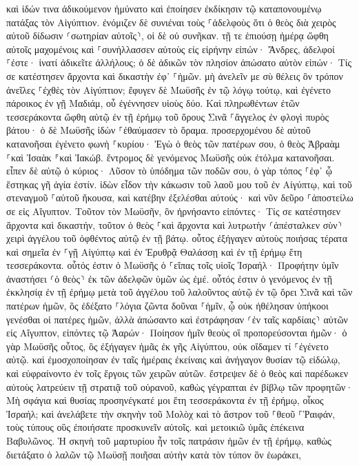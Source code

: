 \documentclass[twoside, 9pt]{extreport}
\begin{document}
καὶ ἰδών τινα ἀδικούμενον ἠμύνατο καὶ ἐποίησεν ἐκδίκησιν τῷ καταπονουμένῳ πατάξας τὸν Αἰγύπτιον. 
ἐνόμιζεν δὲ συνιέναι τοὺς ⸀ἀδελφοὺς ὅτι ὁ θεὸς διὰ χειρὸς αὐτοῦ δίδωσιν ⸂σωτηρίαν αὐτοῖς⸃, οἱ δὲ οὐ συνῆκαν. 
τῇ τε ἐπιούσῃ ἡμέρᾳ ὤφθη αὐτοῖς μαχομένοις καὶ ⸀συνήλλασσεν αὐτοὺς εἰς εἰρήνην εἰπών· Ἄνδρες, ἀδελφοί ⸀ἐστε· ἱνατί ἀδικεῖτε ἀλλήλους; 
ὁ δὲ ἀδικῶν τὸν πλησίον ἀπώσατο αὐτὸν εἰπών· Τίς σε κατέστησεν ἄρχοντα καὶ δικαστὴν ἐφ᾽ ⸀ἡμῶν. 
μὴ ἀνελεῖν με σὺ θέλεις ὃν τρόπον ἀνεῖλες ⸀ἐχθὲς τὸν Αἰγύπτιον; 
ἔφυγεν δὲ Μωϋσῆς ἐν τῷ λόγῳ τούτῳ, καὶ ἐγένετο πάροικος ἐν γῇ Μαδιάμ, οὗ ἐγέννησεν υἱοὺς δύο. 
Καὶ πληρωθέντων ἐτῶν τεσσεράκοντα ὤφθη αὐτῷ ἐν τῇ ἐρήμῳ τοῦ ὄρους Σινᾶ ⸀ἄγγελος ἐν φλογὶ πυρὸς βάτου· 
ὁ δὲ Μωϋσῆς ἰδὼν ⸀ἐθαύμασεν τὸ ὅραμα. προσερχομένου δὲ αὐτοῦ κατανοῆσαι ἐγένετο φωνὴ ⸀κυρίου· 
Ἐγὼ ὁ θεὸς τῶν πατέρων σου, ὁ θεὸς Ἀβραὰμ ⸀καὶ Ἰσαὰκ ⸁καὶ Ἰακώβ. ἔντρομος δὲ γενόμενος Μωϋσῆς οὐκ ἐτόλμα κατανοῆσαι. 
εἶπεν δὲ αὐτῷ ὁ κύριος· Λῦσον τὸ ὑπόδημα τῶν ποδῶν σου, ὁ γὰρ τόπος ⸀ἐφ᾽ ᾧ ἕστηκας γῆ ἁγία ἐστίν. 
ἰδὼν εἶδον τὴν κάκωσιν τοῦ λαοῦ μου τοῦ ἐν Αἰγύπτῳ, καὶ τοῦ στεναγμοῦ ⸀αὐτοῦ ἤκουσα, καὶ κατέβην ἐξελέσθαι αὐτούς· καὶ νῦν δεῦρο ⸀ἀποστείλω σε εἰς Αἴγυπτον. 
Τοῦτον τὸν Μωϋσῆν, ὃν ἠρνήσαντο εἰπόντες· Τίς σε κατέστησεν ἄρχοντα καὶ δικαστήν, τοῦτον ὁ θεὸς ⸀καὶ ἄρχοντα καὶ λυτρωτὴν ⸂ἀπέσταλκεν σὺν⸃ χειρὶ ἀγγέλου τοῦ ὀφθέντος αὐτῷ ἐν τῇ βάτῳ. 
οὗτος ἐξήγαγεν αὐτοὺς ποιήσας τέρατα καὶ σημεῖα ἐν ⸀γῇ Αἰγύπτῳ καὶ ἐν Ἐρυθρᾷ Θαλάσσῃ καὶ ἐν τῇ ἐρήμῳ ἔτη τεσσεράκοντα. 
οὗτός ἐστιν ὁ Μωϋσῆς ὁ ⸀εἴπας τοῖς υἱοῖς Ἰσραήλ· Προφήτην ὑμῖν ἀναστήσει ⸂ὁ θεὸς⸃ ἐκ τῶν ἀδελφῶν ὑμῶν ὡς ἐμέ. 
οὗτός ἐστιν ὁ γενόμενος ἐν τῇ ἐκκλησίᾳ ἐν τῇ ἐρήμῳ μετὰ τοῦ ἀγγέλου τοῦ λαλοῦντος αὐτῷ ἐν τῷ ὄρει Σινᾶ καὶ τῶν πατέρων ἡμῶν, ὃς ἐδέξατο ⸀λόγια ζῶντα δοῦναι ⸀ἡμῖν, 
ᾧ οὐκ ἠθέλησαν ὑπήκοοι γενέσθαι οἱ πατέρες ἡμῶν, ἀλλὰ ἀπώσαντο καὶ ἐστράφησαν ⸂ἐν ταῖς καρδίαις⸃ αὐτῶν εἰς Αἴγυπτον, 
εἰπόντες τῷ Ἀαρών· Ποίησον ἡμῖν θεοὺς οἳ προπορεύσονται ἡμῶν· ὁ γὰρ Μωϋσῆς οὗτος, ὃς ἐξήγαγεν ἡμᾶς ἐκ γῆς Αἰγύπτου, οὐκ οἴδαμεν τί ⸀ἐγένετο αὐτῷ. 
καὶ ἐμοσχοποίησαν ἐν ταῖς ἡμέραις ἐκείναις καὶ ἀνήγαγον θυσίαν τῷ εἰδώλῳ, καὶ εὐφραίνοντο ἐν τοῖς ἔργοις τῶν χειρῶν αὐτῶν. 
ἔστρεψεν δὲ ὁ θεὸς καὶ παρέδωκεν αὐτοὺς λατρεύειν τῇ στρατιᾷ τοῦ οὐρανοῦ, καθὼς γέγραπται ἐν βίβλῳ τῶν προφητῶν· Μὴ σφάγια καὶ θυσίας προσηνέγκατέ μοι ἔτη τεσσεράκοντα ἐν τῇ ἐρήμῳ, οἶκος Ἰσραήλ; 
καὶ ἀνελάβετε τὴν σκηνὴν τοῦ Μολὸχ καὶ τὸ ἄστρον τοῦ ⸀θεοῦ ⸀Ῥαιφάν, τοὺς τύπους οὓς ἐποιήσατε προσκυνεῖν αὐτοῖς. καὶ μετοικιῶ ὑμᾶς ἐπέκεινα Βαβυλῶνος. 
Ἡ σκηνὴ τοῦ μαρτυρίου ἦν τοῖς πατράσιν ἡμῶν ἐν τῇ ἐρήμῳ, καθὼς διετάξατο ὁ λαλῶν τῷ Μωϋσῇ ποιῆσαι αὐτὴν κατὰ τὸν τύπον ὃν ἑωράκει, 
\end{document}
